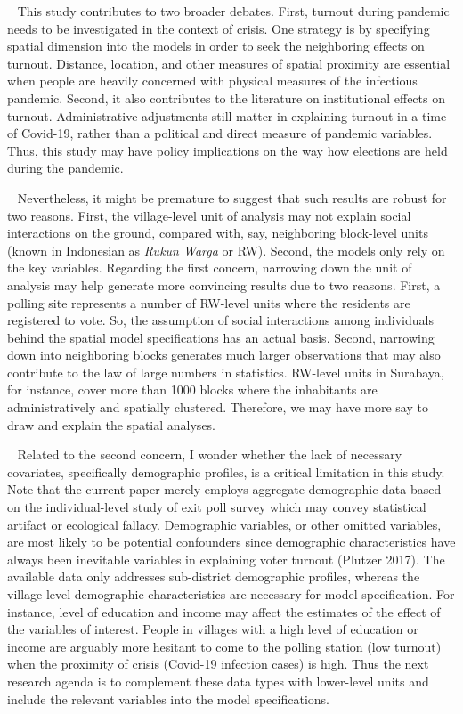 \documentclass[
  12pt,
]{article}
\begin{document}
~ This study contributes to two broader debates. First, turnout during
pandemic needs to be investigated in the context of crisis. One strategy
is by specifying spatial dimension into the models in order to seek the
neighboring effects on turnout. Distance, location, and other measures
of spatial proximity are essential when people are heavily concerned
with physical measures of the infectious pandemic. Second, it also
contributes to the literature on institutional effects on turnout.
Administrative adjustments still matter in explaining turnout in a time
of Covid-19, rather than a political and direct measure of pandemic
variables. Thus, this study may have policy implications on the way how
elections are held during the pandemic.

~ Nevertheless, it might be premature to suggest that such results are
robust for two reasons. First, the village-level unit of analysis may
not explain social interactions on the ground, compared with, say,
neighboring block-level units (known in Indonesian as \emph{Rukun Warga}
or RW). Second, the models only rely on the key variables. Regarding the
first concern, narrowing down the unit of analysis may help generate
more convincing results due to two reasons. First, a polling site
represents a number of RW-level units where the residents are registered
to vote. So, the assumption of social interactions among individuals
behind the spatial model specifications has an actual basis. Second,
narrowing down into neighboring blocks generates much larger
observations that may also contribute to the law of large numbers in
statistics. RW-level units in Surabaya, for instance, cover more than
1000 blocks where the inhabitants are administratively and spatially
clustered. Therefore, we may have more say to draw and explain the
spatial analyses.

~ Related to the second concern, I wonder whether the lack of necessary
covariates, specifically demographic profiles, is a critical limitation
in this study. Note that the current paper merely employs aggregate
demographic data based on the individual-level study of exit poll survey
which may convey statistical artifact or ecological fallacy. Demographic
variables, or other omitted variables, are most likely to be potential
confounders since demographic characteristics have always been
inevitable variables in explaining voter turnout (Plutzer 2017). The
available data only addresses sub-district demographic profiles, whereas
the village-level demographic characteristics are necessary for model
specification. For instance, level of education and income may affect
the estimates of the effect of the variables of interest. People in
villages with a high level of education or income are arguably more
hesitant to come to the polling station (low turnout) when the proximity
of crisis (Covid-19 infection cases) is high. Thus the next research
agenda is to complement these data types with lower-level units and
include the relevant variables into the model specifications.
\end{document}
